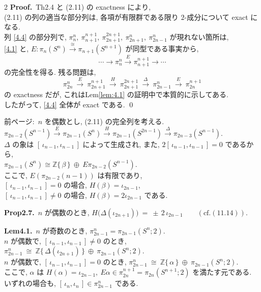 \documentclass[10pt, leqno]{ltjsarticle}
\newcommand{\Ex}{E}        %
\newcommand{\gen}[1]{\{\,#1\,\}}       %
\newcommand{\pis}[2]{\pi_{#1}(#2)}       %
\newcommand{\pit}[2]{\pi_{#1}^{#2}}
\numberwithin{equation}{section}
\theoremstyle{plain}
\theoremstyle{definition}
\theoremstyle{remark}
\begin{document}
\begin{paracol}{2}
\noindent
\textbf{Proof.}\
Th2.4 と (2.11) の exactness により, \\
(2.11) の列の適当な部分列は, 各項が有限群である限り
$2$-成分について exact になる.\\
列 \eqref{4.4} の部分列で,
\(\pit{n}{n},\ \pit{n+1}{n+1},\ \pit{2n+1}{2n+1},\ 
\pit{2n+1}{n},\ \pit{2n-1}{n}\)
が現れない箇所は, \\
\eqref{4.1} と,
$\Ex:\pis{n}{S^n}\xrightarrow{\cong}\pis{n+1}{S^{n+1}}$ が同型である事実から,
\[
\cdots\to\pit{n}{n}\xrightarrow{E}\pit{n+1}{n+1}\to\cdots
\]
の完全性を得る. 
残る問題は,
\[
\pit{2n}{n}\ \xrightarrow{\ \Ex\ }\ \pit{2n+1}{n+1}\
\xrightarrow{\ H\ }\ \pit{2n+1}{2n+1}\
\xrightarrow{\ \Delta\ }\ \pit{2n-1}{n}\
\xrightarrow{E} \ \pit{2n}{n+1}
\]
の exactness だが, これはLem\ref{lem:4.1} の証明中で本質的に示してある.\\ 
したがって, \eqref{4.4} 全体が exact である. 
\qed

\switchcolumn

\noindent
前ページ:\ $n$ を偶数とし, (2.11) の完全列を考える. \\
\(
\pis{2n-2}{S^{n-1}} \xrightarrow{\ \Ex\ } \pis{2n-1}{S^{n}}
\xrightarrow{\ H\ } \pis{2n-1}{S^{2n-1}}
\xrightarrow{\ \Delta\ } \pis{2n-3}{S^{n-1}}.
\)\\
$\Delta$ の象は $[\,\iota_{n-1},\iota_{n-1}\,]$ によって生成され, 
また, $2[\,\iota_{n-1},\iota_{n-1}\,]=0$ であるから, \\
\(
\pis{2n-1}{S^{n}} \cong
\mathbb{Z}\gen{\beta}\ \oplus\ 
E\pis{2n-2}{S^{n-1}} .
\)\\
ここで,
\(E(\pis{2n-2}{n-1})\) は有限であり, \\
$[\,\iota_{n-1},\iota_{n-1}\,]=0$ の場合, $H(\beta)=\iota_{2n-1}$,\\
$[\,\iota_{n-1},\iota_{n-1}\,]\ne0$ の場合, $H(\beta)=2\iota_{2n-1}$ である. 

\noindent
\textbf{Prop2.7.}\
$n$ が偶数のとき,
\(
H\!\bigl(\Delta(\iota_{2n+1})\bigr)\ =\ \pm\,2\,\iota_{2n-1}
\qquad (\text{cf.} (11.14)).
\)

\noindent
\textbf{Lem4.1.}\
$n$ が奇数のとき,  $\pi_{2n-1}^n=\pis{2n-1}{S^n;2} .$\\
$n$ が偶数で, $[\,\iota_{n-1},\iota_{n-1}\,]\ne0$ のとき, 
\(
\pi_{2n-1}^n\ \cong\ \mathbb{Z}\gen{\Delta(\iota_{2n+1})}\ \oplus \ 
\pis{2n-1}{S^n;2} .
\)\\
$n$ が偶数で, $[\,\iota_{n-1},\iota_{n-1}\,]=0$ のとき, 
\(
\pi_{2n-1}^n\ \cong\ \mathbb{Z}\gen{\alpha}\ \oplus \
\pis{2n-1}{S^n;2} .
\)\\
ここで, \(\alpha\) は 
\(H(\alpha)=\iota_{2n-1},\ E\alpha\in\pi_{2n}^{n+1}=\pi_{2n}(S^{n+1};2)\)
を満たす元である. \\
いずれの場合も, $[\,\iota_n,\iota_n\,]\in \pi_{2n-1}^n$ である. 


\end{paracol}
\end{document}

